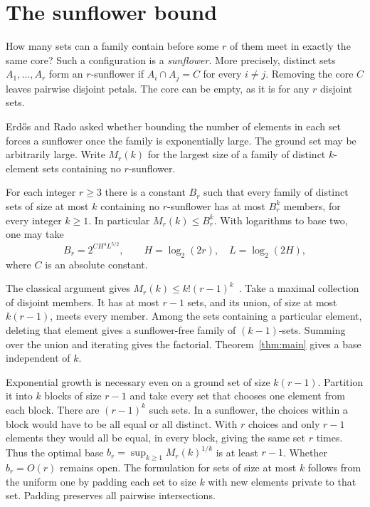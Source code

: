 \section{The sunflower bound}\label{sec:intro}

How many sets can a family contain before some \(r\) of them meet in
exactly the same core? Such a configuration is a \emph{sunflower}.
More precisely, distinct sets \(A_1,\ldots,A_r\) form an \(r\)-sunflower
if \(A_i\cap A_j=C\) for every \(i\ne j\). Removing the core \(C\)
leaves pairwise disjoint petals. The core can be empty, as it is
for any \(r\) disjoint sets.

Erd\H{o}s and Rado asked whether bounding the number of elements in
each set forces a sunflower once the family is exponentially large.
The ground set may be arbitrarily large. Write \(M_r(k)\) for the
largest size of a family of distinct \(k\)-element sets containing
no \(r\)-sunflower.

\begin{theorem}\label{thm:main}
For each integer \(r\ge3\) there is a constant \(B_r\) such that every
family of distinct sets of size at most \(k\) containing no
\(r\)-sunflower has at most \(B_r^k\) members, for every integer
\(k\ge1\). In particular \(M_r(k)\le B_r^k\). With logarithms to
base two, one may take
\[
 B_r=2^{C H^4 L^{5/2}},\qquad H=\log_2(2r),\quad L=\log_2(2H),
\]
where \(C\) is an absolute constant.
\end{theorem}

The classical argument gives \(M_r(k)\le k!(r-1)^k\)~\cite{ER}.
Take a maximal collection of disjoint members. It has at most \(r-1\)
sets, and its union, of size at most \(k(r-1)\), meets every member.
Among the sets containing a particular element, deleting that element
gives a sunflower-free family of \((k-1)\)-sets. Summing over the union
and iterating gives the factorial. Theorem~\ref{thm:main} gives a base
independent of \(k\).

Exponential growth is necessary even on a ground set of size \(k(r-1)\).
Partition it into \(k\) blocks of size \(r-1\) and take every set that
chooses one element from each block. There are \((r-1)^k\) such sets.
In a sunflower, the choices within a block would have to be all equal
or all distinct. With \(r\) choices and only \(r-1\) elements they would
all be equal, in every block, giving the same set \(r\) times. Thus the
optimal base \(b_r=\sup_{k\ge1}M_r(k)^{1/k}\) is at least \(r-1\).
Whether \(b_r=O(r)\) remains open. The formulation for sets of size at
most \(k\) follows from the uniform one by padding each set to size
\(k\) with new elements private to that set. Padding preserves all
pairwise intersections.

